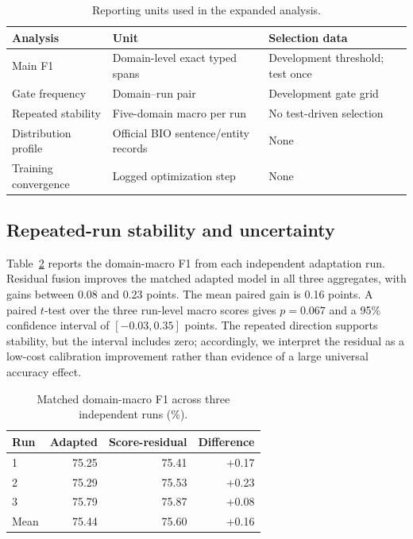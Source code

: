 \documentclass[a4paper,fleqn,numbers,doubleblind]{cas-dc}
\begin{document}
\begin{table}[t]
\centering
\caption{Reporting units used in the expanded analysis.}
\label{tab:analysisunits}
\begin{tabular}{lll}
\toprule
Analysis & Unit & Selection data\\
\midrule
Main F1 & Domain-level exact typed spans & Development threshold; test once\\
Gate frequency & Domain--run pair & Development gate grid\\
Repeated stability & Five-domain macro per run & No test-driven selection\\
Distribution profile & Official BIO sentence/entity records & None\\
Training convergence & Logged optimization step & None\\
\bottomrule
\end{tabular}
\end{table}

\subsection{Repeated-run stability and uncertainty}
Table~\ref{tab:repeat} reports the domain-macro F1 from each independent adaptation run. Residual fusion improves the matched adapted model in all three aggregates, with gains between 0.08 and 0.23 points. The mean paired gain is 0.16 points. A paired $t$-test over the three run-level macro scores gives $p=0.067$ and a 95\% confidence interval of $[-0.03,0.35]$ points. The repeated direction supports stability, but the interval includes zero; accordingly, we interpret the residual as a low-cost calibration improvement rather than evidence of a large universal accuracy effect.

\begin{table}[t]
\centering
\caption{Matched domain-macro F1 across three independent runs (\%).}
\label{tab:repeat}
\begin{tabular}{lrrr}
\toprule
Run & Adapted & Score-residual & Difference\\
\midrule
1 & 75.25 & 75.41 & +0.17\\
2 & 75.29 & 75.53 & +0.23\\
3 & 75.79 & 75.87 & +0.08\\
\midrule
Mean & 75.44 & 75.60 & +0.16\\
\bottomrule
\end{tabular}
\end{table}
\end{document}
